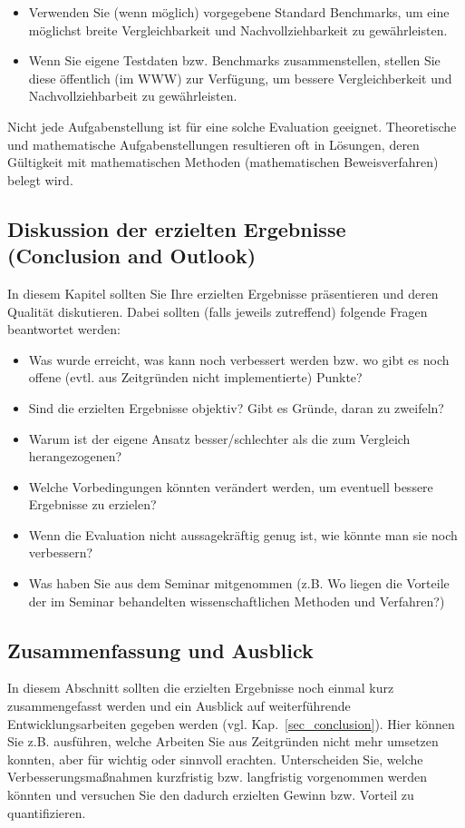 \begin{itemize}
\item Verwenden Sie (wenn möglich) vorgegebene Standard Benchmarks, um eine möglichst breite Vergleichbarkeit und Nachvollziehbarkeit zu gewährleisten.
\item Wenn Sie eigene Testdaten bzw. Benchmarks zusammenstellen, stellen Sie diese öffentlich (im WWW) zur Verfügung, um bessere Vergleichberkeit und Nachvollziehbarbeit zu gewährleisten.
\end{itemize}

\bigskip

Nicht jede Aufgabenstellung ist für eine solche Evaluation geeignet. Theoretische und mathematische Aufgabenstellungen resultieren oft in Lösungen, deren Gültigkeit mit mathematischen Methoden (mathematischen Beweisverfahren) belegt wird.



\subsection{Diskussion der erzielten Ergebnisse (Conclusion and Outlook)}
In diesem Kapitel sollten Sie Ihre erzielten Ergebnisse präsentieren und deren Qualität diskutieren.
Dabei sollten (falls jeweils zutreffend) folgende Fragen beantwortet werden:
\begin{itemize}
\item Was wurde erreicht, was kann noch verbessert werden bzw. wo gibt es noch offene (evtl. aus Zeitgründen nicht implementierte) Punkte?
\item Sind die erzielten Ergebnisse objektiv? Gibt es Gründe, daran zu zweifeln?
\item Warum ist der eigene Ansatz besser/schlechter als die zum Vergleich herangezogenen?
\item Welche Vorbedingungen könnten verändert werden, um eventuell bessere Ergebnisse zu erzielen?
\item Wenn die Evaluation nicht aussagekräftig genug ist, wie könnte man sie noch verbessern?
\item Was haben Sie aus dem Seminar mitgenommen (z.B. Wo liegen die Vorteile der im Seminar behandelten wissenschaftlichen Methoden und Verfahren?)
\end{itemize}


\subsection{Zusammenfassung und Ausblick}

In diesem Abschnitt sollten die erzielten Ergebnisse noch einmal kurz zusammengefasst werden und ein Ausblick auf weiterführende Entwicklungsarbeiten gegeben werden (vgl. Kap.~\ref{sec_conclusion}). Hier können Sie z.B. ausführen, welche Arbeiten Sie aus Zeitgründen nicht mehr umsetzen konnten, aber für wichtig oder sinnvoll erachten. 
Unterscheiden Sie, welche Verbesserungsmaßnahmen kurzfristig bzw. langfristig vorgenommen werden könnten und versuchen Sie den dadurch erzielten Gewinn bzw. Vorteil zu quantifizieren.
